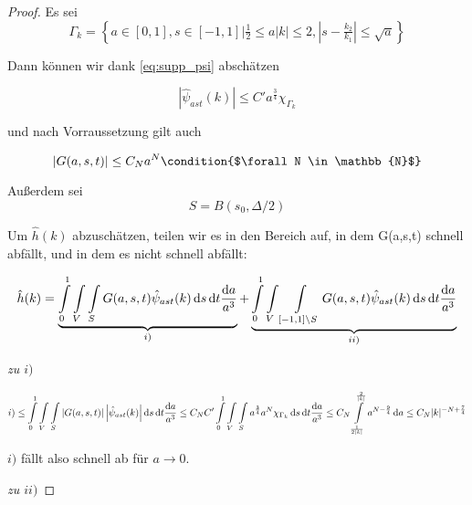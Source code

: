 \begin{proof}
Es sei
\begin{equation*}
    \Gamma_k = \left\{a\in [0,1], s \in [-1,1] \big| \tfrac{1}{2} \leq a|k| \leq 2 , \left|s-\tfrac{k_2}{k_1} \right| \leq \sqrt a
                   \right\}
\end{equation*}

Dann können wir dank \cref{eq:supp_psi} abschätzen

\begin{equation*}
    | \hat \psi_{ast} (k)| \leq C' a^{\frac{3}{4}} \chi_{\Gamma_k}
\end{equation*}

und nach Vorraussetzung gilt auch

\begin{equation*}
    |G(a,s,t)| \leq C_{N} a^{N} \condition{$\forall N \in \mathbb{N}$}
\end{equation*}

Außerdem sei
\begin{equation*}
    S = B(s_0,\Delta/2)
\end{equation*}

Um $\hat h(k)$ abzuschätzen, teilen wir es in den Bereich auf, in dem G(a,s,t) schnell abfällt, und in dem es nicht schnell abfällt:

\begin{dmath*}
    \hat h(k) =
    \underbrace{
    \int \limits_0^1 \int \limits_V \int \limits_{S}
    G(a,s,t) \hat \psi_{ast} (k)
        \d s \d t \frac{\d a}{a^3}}_{i)}
     +
    \underbrace{
     \int \limits_0^1 \int \limits_V \int \limits_{[-1,1]\setminus S}
    G(a,s,t) \hat \psi_{ast} (k)
        \d s \d t \frac{\d a}{a^3}}_{ii)}
\end{dmath*}


\emph{zu $i)$}

\begin{dmath*}
    i) \leq \int \limits_0^1 \int \limits_V \int \limits_{S}
    \left\lvert G(a,s,t)\right\rvert
    \left\lvert \hat \psi_{ast} (k) \right\rvert
        \d s \d t \frac{\d a}{a^3}
    \leq
    C_N C'
    \int \limits_0^1 \int \limits_V \int \limits_{S}
    a^{\frac{3}{4}} a^N \chi_{\Gamma_k} \d s \d t \frac{\d a}{a^3}
    \leq
    C_N \int \limits_{\frac{1}{2|k|}}^{\frac{2}{|k|}}
    a^{N-\frac{9}{4}} \d a
    \le C_N |k|^{-N+\frac{7}{4}}
\end{dmath*}

$i)$ fällt also schnell ab für $a \to 0$.


\emph{zu $ii)$}


\end{proof}
